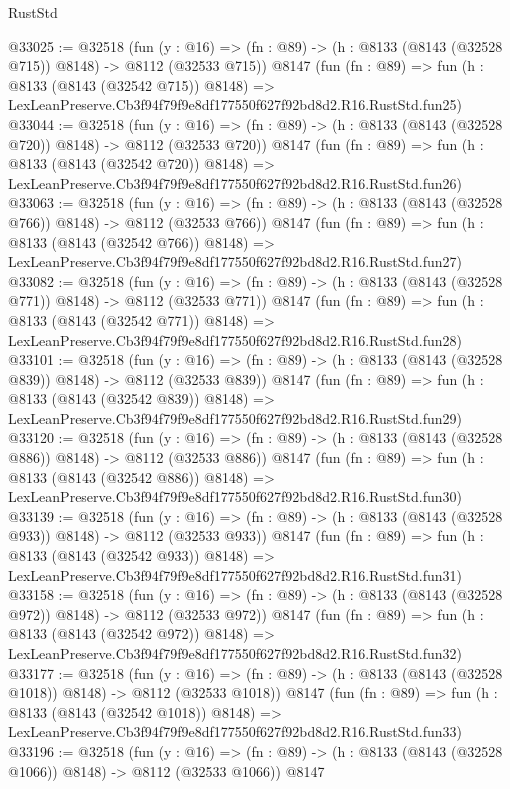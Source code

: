 \begin{lexlean}{RustStd}
\begin{coremodule}
@33025 := @32518
    (fun (y : @16) => (fn : @89) -> (h : @8133 (@8143 (@32528 @715)) @8148) -> @8112 (@32533 @715))
    @8147
    (fun (fn : @89) =>
    fun (h : @8133 (@8143 (@32542 @715)) @8148) =>
    LexLeanPreserve.Cb3f94f79f9e8df177550f627f92bd8d2.R16.RustStd.fun25)
@33044 := @32518
    (fun (y : @16) => (fn : @89) -> (h : @8133 (@8143 (@32528 @720)) @8148) -> @8112 (@32533 @720))
    @8147
    (fun (fn : @89) =>
    fun (h : @8133 (@8143 (@32542 @720)) @8148) =>
    LexLeanPreserve.Cb3f94f79f9e8df177550f627f92bd8d2.R16.RustStd.fun26)
@33063 := @32518
    (fun (y : @16) => (fn : @89) -> (h : @8133 (@8143 (@32528 @766)) @8148) -> @8112 (@32533 @766))
    @8147
    (fun (fn : @89) =>
    fun (h : @8133 (@8143 (@32542 @766)) @8148) =>
    LexLeanPreserve.Cb3f94f79f9e8df177550f627f92bd8d2.R16.RustStd.fun27)
@33082 := @32518
    (fun (y : @16) => (fn : @89) -> (h : @8133 (@8143 (@32528 @771)) @8148) -> @8112 (@32533 @771))
    @8147
    (fun (fn : @89) =>
    fun (h : @8133 (@8143 (@32542 @771)) @8148) =>
    LexLeanPreserve.Cb3f94f79f9e8df177550f627f92bd8d2.R16.RustStd.fun28)
@33101 := @32518
    (fun (y : @16) => (fn : @89) -> (h : @8133 (@8143 (@32528 @839)) @8148) -> @8112 (@32533 @839))
    @8147
    (fun (fn : @89) =>
    fun (h : @8133 (@8143 (@32542 @839)) @8148) =>
    LexLeanPreserve.Cb3f94f79f9e8df177550f627f92bd8d2.R16.RustStd.fun29)
@33120 := @32518
    (fun (y : @16) => (fn : @89) -> (h : @8133 (@8143 (@32528 @886)) @8148) -> @8112 (@32533 @886))
    @8147
    (fun (fn : @89) =>
    fun (h : @8133 (@8143 (@32542 @886)) @8148) =>
    LexLeanPreserve.Cb3f94f79f9e8df177550f627f92bd8d2.R16.RustStd.fun30)
@33139 := @32518
    (fun (y : @16) => (fn : @89) -> (h : @8133 (@8143 (@32528 @933)) @8148) -> @8112 (@32533 @933))
    @8147
    (fun (fn : @89) =>
    fun (h : @8133 (@8143 (@32542 @933)) @8148) =>
    LexLeanPreserve.Cb3f94f79f9e8df177550f627f92bd8d2.R16.RustStd.fun31)
@33158 := @32518
    (fun (y : @16) => (fn : @89) -> (h : @8133 (@8143 (@32528 @972)) @8148) -> @8112 (@32533 @972))
    @8147
    (fun (fn : @89) =>
    fun (h : @8133 (@8143 (@32542 @972)) @8148) =>
    LexLeanPreserve.Cb3f94f79f9e8df177550f627f92bd8d2.R16.RustStd.fun32)
@33177 := @32518
    (fun (y : @16) =>
    (fn : @89) -> (h : @8133 (@8143 (@32528 @1018)) @8148) -> @8112 (@32533 @1018))
    @8147
    (fun (fn : @89) =>
    fun (h : @8133 (@8143 (@32542 @1018)) @8148) =>
    LexLeanPreserve.Cb3f94f79f9e8df177550f627f92bd8d2.R16.RustStd.fun33)
@33196 := @32518
    (fun (y : @16) =>
    (fn : @89) -> (h : @8133 (@8143 (@32528 @1066)) @8148) -> @8112 (@32533 @1066))
    @8147

\end{coremodule}
\end{lexlean}
